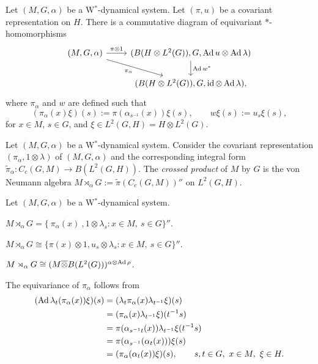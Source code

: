 \documentclass{../../../small}
\begin{document}
\begin{prop}
Let $(M,G,\alpha)$ be a W$^*$-dynamical system.
Let $(\pi,u)$ be a covariant representation on $H$.
There is a commutative diagram of equivariant $*$-homomorphisms
\[\begin{tikzcd}
(M,G,\alpha) \rar{\pi\otimes1} \ar[swap]{dr}{\pi_\alpha} & (B(H\otimes L^2(G)),G,\Ad u\otimes\Ad\lambda) \dar{\Ad w^*}\\
&(B(H\otimes L^2(G)),G,\id\otimes\Ad\lambda),
\end{tikzcd}\]
where $\pi_\alpha$ and $w$ are defined such that
\[(\pi_\alpha(x)\xi)(s):=\pi(\alpha_{s^{-1}}(x))\xi(s),\qquad w\xi(s):=u_s\xi(s),\]
for $x\in M$, $s\in G$, and $\xi\in L^2(G,H)=H\otimes L^2(G)$.
\end{prop}

\begin{defn}
Let $(M,G,\alpha)$ be a W$^*$-dynamical system.
Consider the covariant representation $(\pi_\alpha,1\otimes\lambda)$ of $(M,G,\alpha)$ and the corresponding integral form $\tilde\pi_\alpha:C_c(G,M)\to B(L^2(G,H))$.
The \emph{crossed product} of $M$ by $G$ is the von Neumann algebra $M\rtimes_\alpha G:=\tilde\pi(C_c(G,M))''$ on $L^2(G,H)$.
\end{defn}
\begin{prop}
Let $(M,G,\alpha)$ be a W$^*$-dynamical system.
\begin{parts}
\item $M\rtimes_\alpha G=\{\ \pi_\alpha(x)\ ,1\otimes\lambda_s:x\in M,\ s\in G\}''$.
\item $M\rtimes_\alpha G\cong\{\pi(x)\otimes1,u_s\otimes\lambda_s:x\in M,\ s\in G\}''$.
\item $M\rtimes_\alpha G\cong(M\overline\otimes B(L^2(G)))^{\alpha\otimes\operatorname{Ad}\rho}$.
\end{parts}
\end{prop}
\begin{pf}
The equivariance of $\pi_\alpha$ follows from
\begin{align*}
(\operatorname{Ad}\lambda_t(\pi_\alpha(x))\xi)(s)
&=(\lambda_t\pi_\alpha(x)\lambda_{t^{-1}}\xi)(s)\\
&=(\pi_\alpha(x)\lambda_{t^{-1}}\xi)(t^{-1}s)\\
&=\pi(\alpha_{s^{-1}t}(x))\lambda_{t^{-1}}\xi(t^{-1}s)\\
&=\pi(\alpha_{s^{-1}}(\alpha_t(x)))\xi(s)\\
&=(\pi_\alpha(\alpha_t(x))\xi)(s),\qquad s,t\in G,\ x\in M,\ \xi\in H.
\end{align*}

\end{pf}
\end{document}
